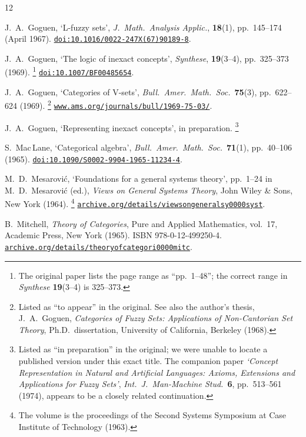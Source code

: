 \documentclass[10pt,a4paper,twocolumn]{article}
\begin{document}
\begin{thebibliography}{12}

J.~A.~Goguen, `L-fuzzy sets',
\emph{J.~Math.\ Analysis Applic.}, \textbf{18}(1), pp.~145--174 (April 1967).
\href{https://doi.org/10.1016/0022-247X(67)90189-8}%
     {\nolinkurl{doi:10.1016/0022-247X(67)90189-8}}.

J.~A.~Goguen, `The logic of inexact concepts',
\emph{Synthese}, \textbf{19}(3--4), pp.~325--373 (1969).%
\footnote{The original paper lists the page range as ``pp.~1--48''; the
  correct range in \emph{Synthese} \textbf{19}(3--4) is 325--373.}
\href{https://doi.org/10.1007/BF00485654}%
     {\nolinkurl{doi:10.1007/BF00485654}}.

J.~A.~Goguen, `Categories of V-sets',
\emph{Bull.\ Amer.\ Math.\ Soc.}\ \textbf{75}(3), pp.~622--624 (1969).%
\footnote{Listed as ``to appear'' in the original.
See also the author's
  thesis, J.~A.~Goguen, \emph{Categories of Fuzzy Sets: Applications of
  Non-Cantorian Set Theory}, Ph.D.\ dissertation, University of California,
  Berkeley (1968).}
\href{https://www.ams.org/journals/bull/1969-75-03/}%
     {\nolinkurl{www.ams.org/journals/bull/1969-75-03/}}.

J.~A.~Goguen, `Representing inexact concepts', in preparation.%
\footnote{Listed as ``in preparation'' in the original; we were unable to
  locate a published version under this exact title.
  The companion paper
  \emph{`Concept Representation in Natural and Artificial Languages:
  Axioms, Extensions and Applications for Fuzzy Sets'},
  \emph{Int.\ J.\ Man-Machine Stud.}\ \textbf{6}, pp.~513--561 (1974),
  appears to be a closely related continuation.}

S.~Mac\,Lane, `Categorical algebra',
\emph{Bull.\ Amer.\ Math.\ Soc.}\ \textbf{71}(1), pp.~40--106 (1965).
\href{https://doi.org/10.1090/S0002-9904-1965-11234-4}%
     {\nolinkurl{doi:10.1090/S0002-9904-1965-11234-4}}.

M.~D.~Mesarovi\'{c}, `Foundations for a general systems theory',
pp.~1--24 in M.~D.~Mesarovi\'{c} (ed.), \emph{Views on General Systems
Theory}, John Wiley \& Sons, New York (1964).%
\footnote{The volume is the proceedings of the Second Systems Symposium
  at Case Institute of Technology (1963).}
\href{https://archive.org/details/viewsongeneralsy0000syst}%
     {\nolinkurl{archive.org/details/viewsongeneralsy0000syst}}.

B.~Mitchell, \emph{Theory of Categories}, Pure and Applied Mathematics,
vol.~17, Academic Press, New York (1965).
ISBN 978-0-12-499250-4.
\href{https://archive.org/details/theoryofcategori0000mitc}%
     {\nolinkurl{archive.org/details/theoryofcategori0000mitc}}.


\end{thebibliography}
\end{document}

